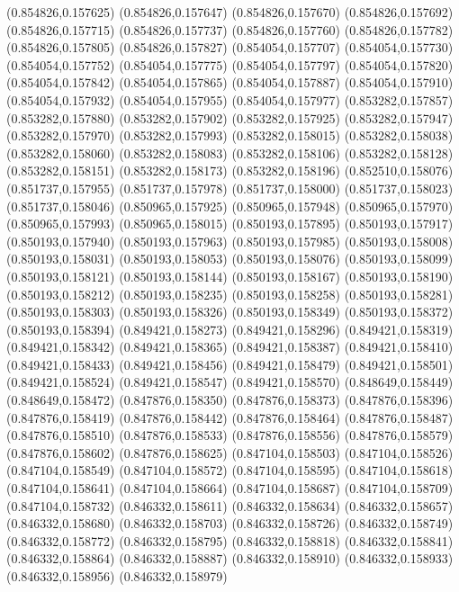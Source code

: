 (0.854826,0.157625)
(0.854826,0.157647)
(0.854826,0.157670)
(0.854826,0.157692)
(0.854826,0.157715)
(0.854826,0.157737)
(0.854826,0.157760)
(0.854826,0.157782)
(0.854826,0.157805)
(0.854826,0.157827)
(0.854054,0.157707)
(0.854054,0.157730)
(0.854054,0.157752)
(0.854054,0.157775)
(0.854054,0.157797)
(0.854054,0.157820)
(0.854054,0.157842)
(0.854054,0.157865)
(0.854054,0.157887)
(0.854054,0.157910)
(0.854054,0.157932)
(0.854054,0.157955)
(0.854054,0.157977)
(0.853282,0.157857)
(0.853282,0.157880)
(0.853282,0.157902)
(0.853282,0.157925)
(0.853282,0.157947)
(0.853282,0.157970)
(0.853282,0.157993)
(0.853282,0.158015)
(0.853282,0.158038)
(0.853282,0.158060)
(0.853282,0.158083)
(0.853282,0.158106)
(0.853282,0.158128)
(0.853282,0.158151)
(0.853282,0.158173)
(0.853282,0.158196)
(0.852510,0.158076)
(0.851737,0.157955)
(0.851737,0.157978)
(0.851737,0.158000)
(0.851737,0.158023)
(0.851737,0.158046)
(0.850965,0.157925)
(0.850965,0.157948)
(0.850965,0.157970)
(0.850965,0.157993)
(0.850965,0.158015)
(0.850193,0.157895)
(0.850193,0.157917)
(0.850193,0.157940)
(0.850193,0.157963)
(0.850193,0.157985)
(0.850193,0.158008)
(0.850193,0.158031)
(0.850193,0.158053)
(0.850193,0.158076)
(0.850193,0.158099)
(0.850193,0.158121)
(0.850193,0.158144)
(0.850193,0.158167)
(0.850193,0.158190)
(0.850193,0.158212)
(0.850193,0.158235)
(0.850193,0.158258)
(0.850193,0.158281)
(0.850193,0.158303)
(0.850193,0.158326)
(0.850193,0.158349)
(0.850193,0.158372)
(0.850193,0.158394)
(0.849421,0.158273)
(0.849421,0.158296)
(0.849421,0.158319)
(0.849421,0.158342)
(0.849421,0.158365)
(0.849421,0.158387)
(0.849421,0.158410)
(0.849421,0.158433)
(0.849421,0.158456)
(0.849421,0.158479)
(0.849421,0.158501)
(0.849421,0.158524)
(0.849421,0.158547)
(0.849421,0.158570)
(0.848649,0.158449)
(0.848649,0.158472)
(0.847876,0.158350)
(0.847876,0.158373)
(0.847876,0.158396)
(0.847876,0.158419)
(0.847876,0.158442)
(0.847876,0.158464)
(0.847876,0.158487)
(0.847876,0.158510)
(0.847876,0.158533)
(0.847876,0.158556)
(0.847876,0.158579)
(0.847876,0.158602)
(0.847876,0.158625)
(0.847104,0.158503)
(0.847104,0.158526)
(0.847104,0.158549)
(0.847104,0.158572)
(0.847104,0.158595)
(0.847104,0.158618)
(0.847104,0.158641)
(0.847104,0.158664)
(0.847104,0.158687)
(0.847104,0.158709)
(0.847104,0.158732)
(0.846332,0.158611)
(0.846332,0.158634)
(0.846332,0.158657)
(0.846332,0.158680)
(0.846332,0.158703)
(0.846332,0.158726)
(0.846332,0.158749)
(0.846332,0.158772)
(0.846332,0.158795)
(0.846332,0.158818)
(0.846332,0.158841)
(0.846332,0.158864)
(0.846332,0.158887)
(0.846332,0.158910)
(0.846332,0.158933)
(0.846332,0.158956)
(0.846332,0.158979)
